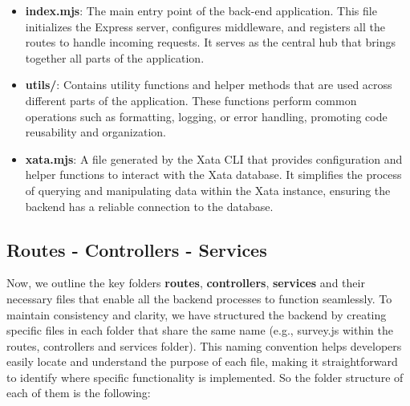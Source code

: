 \begin{itemize}
\begin{itemize}
        \item \textbf{index.mjs}: The main entry point of the back-end application. This file initializes the Express server, configures middleware, and registers all the routes to handle incoming requests. It serves as the central hub that brings together all parts of the application.

        \item \textbf{utils/}: Contains utility functions and helper methods that are used across different parts of the application. These functions perform common operations such as formatting, logging, or error handling, promoting code reusability and organization.

        \item \textbf{xata.mjs}: A file generated by the Xata CLI that provides configuration and helper functions to interact with the Xata database. It simplifies the process of querying and manipulating data within the Xata instance, ensuring the backend has a reliable connection to the database.
    \end{itemize}
\end{itemize}


\subsection{Routes - Controllers - Services}

Now, we outline the key folders \textbf{routes}, \textbf{controllers}, \textbf{services} and their necessary files that enable all the backend processes to function seamlessly. To maintain consistency and clarity, we have structured the backend by creating specific files in each folder that share the same name (e.g., survey.js within the routes, controllers and services folder). This naming convention helps developers easily locate and understand the purpose of each file, making it straightforward to identify where specific functionality is implemented. So the folder structure of each of them is the following:

\vspace{5mm}

